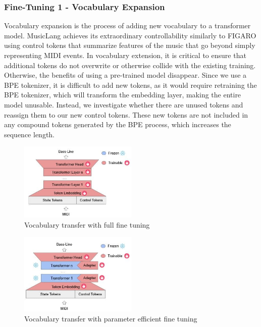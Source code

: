 \subsubsection{Fine-Tuning 1 - Vocabulary Expansion}

Vocabulary expansion is the process of adding new vocabulary to a transformer model. MusicLang achieves its extraordinary controllability similarly to FIGARO \cite{Rütte_figaro_2023} using control tokens that summarize features of the music that go beyond simply representing MIDI events. In vocabulary extension, it is critical to ensure that additional tokens do not overwrite or otherwise collide with the existing training. Otherwise, the benefits of using a pre-trained model disappear. Since we use a BPE tokenizer, it is difficult to add new tokens, as it would require retraining the BPE tokenizer, which will transform the embedding layer, making the entire model unusable. Instead, we investigate whether there are unused tokens and reassign them to our new control tokens. These new tokens are not included in any compound tokens generated by the BPE process, which increases the sequence length.

\begin{figure}[H]
    \centering
    \includegraphics[width=0.5\textwidth]{IMAGES/full_ft.jpg}
    \caption{Vocabulary transfer with full fine tuning}
    \label{fig:vocabtrans1}
\end{figure}

\begin{figure}[H]
    \centering
    \includegraphics[width=0.5\textwidth]{IMAGES/vocab_lora_ft.jpg} 
    \caption{Vocabulary transfer with parameter efficient fine tuning}
    \label{fig:vocabtrans2}
\end{figure}

